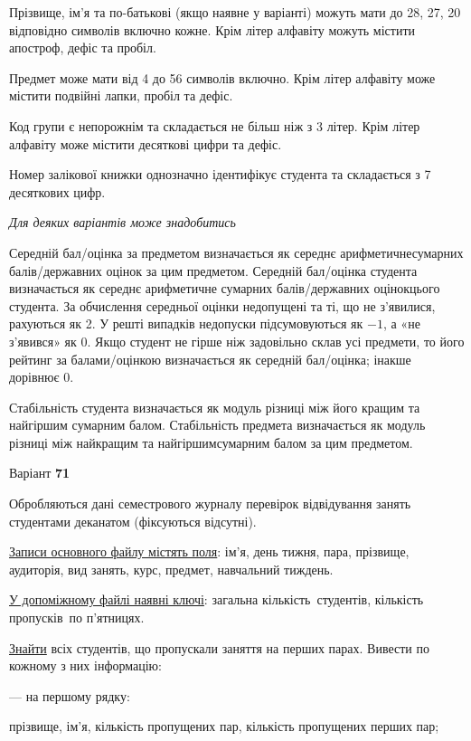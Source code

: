 \documentclass[11pt, ukrainian]{article}
\begin{document}
Прізвище, ім’я та по-батькові (якщо наявне у варіанті) можуть мати до 28, 27, 20 відповідно символів включно кожне. 
Крім літер алфавіту можуть містити апостроф, дефіс та пробіл.

Предмет може мати від 4 до 56 символів включно. 
Крім літер алфавіту може містити подвійні лапки, пробіл та дефіс.

Код групи є непорожнім та складається не більш ніж з 3 літер. 
Крім літер алфавіту може містити десяткові цифри та дефіс.


Номер залікової книжки однозначно ідентифікує студента та складається з 7 десяткових цифр. 

\bigskip\textit{Для деяких варіантів може знадобитись}

Середній бал/оцінка за предметом визначається як середнє арифметичнесумарних балів/державних оцінок за цим предметом. 
Середній бал/оцінка студента визначається як середнє арифметичне сумарних балів/державних оцінокцього студента. 
За обчислення середньої оцінки недопущені та ті, що не з’явилися, рахуються як 2.
У решті випадків недопуски підсумовуються як $-1$, а «не з’явився» як 0.
Якщо студент не гірше ніж задовільно склав усі предмети, 
то його рейтинг за балами/оцінкою визначається як середній бал/оцінка; інакше дорівнює 0.

Стабільність студента визначається як модуль різниці між його кращим та найгіршим сумарним балом.
Стабільність предмета визначається як модуль різниці між найкращим та найгіршимсумарним балом за цим предметом.






\par
\newpage
{\center Варіант  \No \textbf { 71 }\par}
\bigskip
Обробляються дані семестрового журналу перевірок відвідування занять студентами деканатом (фіксуються відсутні). 

\underline{Записи основного файлу містять поля}: ім’я, день тижня, пара, прізвище, аудиторія, вид занять, курс, предмет, навчальний тиждень.

\underline{У допоміжному файлі наявні ключі}: загальна кількість\ студентів, кількість пропусків\ по п’ятни\-цях.

\underline{Знайти} всіх студентів, що пропускали заняття на перших парах. Вивести по кожному з них інформацію:\par
{\noindent}--- на першому рядку:\par
прізвище, ім’я, кількість пропущених пар, кількість пропущених перших пар;
\end{document}
